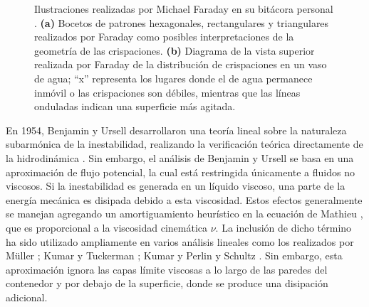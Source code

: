 \begin{center}
\begin{figure}
		\caption[Ilustraciones realizadas por Michael Faraday en su bitácora personal]{Ilustraciones realizadas por Michael Faraday en su bitácora personal \cite{Martin1832}. \textbf{(a)} Bocetos de patrones hexagonales, rectangulares y triangulares realizados por Faraday como posibles interpretaciones de la geometría de las crispaciones. \textbf{(b)} Diagrama de la vista superior realizada por Faraday de la distribución de crispaciones en un vaso de agua; ``x'' representa los lugares donde el de agua permanece inmóvil o las crispaciones son débiles, mientras que las líneas onduladas indican una superficie más agitada. \cite{Martin1832} } %
	\end{figure}
\end{center}

En 1954, Benjamin y Ursell desarrollaron una teoría lineal sobre la naturaleza subarmónica de la inestabilidad, realizando la verificación teórica directamente de la hidrodinámica \cite{Benjamin1954}. Sin embargo, el análisis de Benjamin y Ursell se basa en una aproximación de flujo potencial, la cual está restringida únicamente a fluidos no viscosos. Si la inestabilidad es generada en un líquido viscoso, una parte de la energía mecánica es disipada debido a esta viscosidad. Estos efectos generalmente se manejan agregando un amortiguamiento heurístico en la ecuación de Mathieu \cite{Landau1988}, que es proporcional a la viscosidad cinemática $\nu$. La inclusión de dicho término ha sido utilizado ampliamente en varios análisis lineales como los realizados por Müller \cite{Muller1993}; Kumar y Tuckerman \cite{Kumar1994}; Kumar \cite{Kumar1996} y Perlin y Schultz \cite{Perlin2000}. Sin embargo, esta aproximación ignora las capas límite viscosas a lo largo de las paredes del contenedor y por debajo de la superficie, donde se produce una disipación adicional. \medskip

